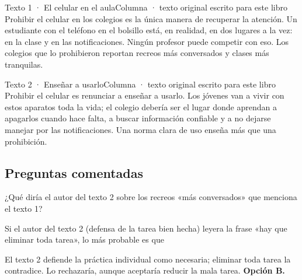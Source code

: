 \begin{texto}{Texto 1 · El celular en el aula}{Columna · texto original escrito para este libro}
\pa Prohibir el celular en los colegios es la única manera de recuperar la atención. Un estudiante con el teléfono en el
bolsillo está, en realidad, en dos lugares a la vez: en la clase y en las notificaciones. Ningún profesor puede competir
con eso. Los colegios que lo prohibieron reportan recreos más conversados y clases más tranquilas.
\end{texto}

\begin{texto}{Texto 2 · Enseñar a usarlo}{Columna · texto original escrito para este libro}
\pa Prohibir el celular es renunciar a enseñar a usarlo. Los jóvenes van a vivir con estos aparatos toda la vida; el
colegio debería ser el lugar donde aprendan a apagarlos cuando hace falta, a buscar información confiable y a no dejarse
manejar por las notificaciones. Una norma clara de uso enseña más que una prohibición.
\end{texto}

\subsection{Preguntas comentadas}
\begin{comentada}{¿Qué diría el autor del texto 2 sobre los recreos «más conversados» que menciona el texto 1?}
\end{comentada}

\begin{reto}
Si el autor del texto 2 (defensa de la tarea bien hecha) leyera la frase «hay que eliminar toda tarea», lo más probable es
que
\end{reto}

\begin{retoresuelto}
El texto 2 defiende la práctica individual como necesaria; eliminar toda tarea la contradice. Lo rechazaría, aunque
aceptaría reducir la mala tarea. \textbf{Opción B.}
\end{retoresuelto}

